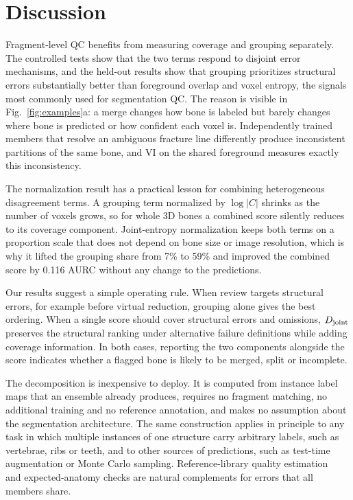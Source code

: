 \documentclass[conference]{IEEEtran}
\begin{document}
\section{Discussion}
Fragment-level QC benefits from measuring coverage and grouping separately. The controlled tests show that the two terms respond to disjoint error mechanisms, and the held-out results show that grouping prioritizes structural errors substantially better than foreground overlap and voxel entropy, the signals most commonly used for segmentation QC. The reason is visible in Fig.~\ref{fig:examples}a: a merge changes how bone is labeled but barely changes where bone is predicted or how confident each voxel is. Independently trained members that resolve an ambiguous fracture line differently produce inconsistent partitions of the same bone, and VI on the shared foreground measures exactly this inconsistency.

The normalization result has a practical lesson for combining heterogeneous disagreement terms. A grouping term normalized by $\log|C|$ shrinks as the number of voxels grows, so for whole 3D bones a combined score silently reduces to its coverage component. Joint-entropy normalization keeps both terms on a proportion scale that does not depend on bone size or image resolution, which is why it lifted the grouping share from 7\% to 59\% and improved the combined score by 0.116 AURC without any change to the predictions.

Our results suggest a simple operating rule. When review targets structural errors, for example before virtual reduction, grouping alone gives the best ordering. When a single score should cover structural errors and omissions, $D_{\rm joint}$ preserves the structural ranking under alternative failure definitions while adding coverage information. In both cases, reporting the two components alongside the score indicates whether a flagged bone is likely to be merged, split or incomplete.

The decomposition is inexpensive to deploy. It is computed from instance label maps that an ensemble already produces, requires no fragment matching, no additional training and no reference annotation, and makes no assumption about the segmentation architecture. The same construction applies in principle to any task in which multiple instances of one structure carry arbitrary labels, such as vertebrae, ribs or teeth, and to other sources of predictions, such as test-time augmentation or Monte Carlo sampling. Reference-library quality estimation~\cite{valindria2017} and expected-anatomy checks are natural complements for errors that all members share.
\end{document}
